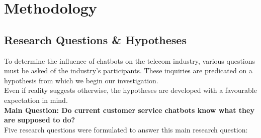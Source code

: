 \mainmatter
\pagestyle{headings}

\chapter{Methodology}
\label{ch:methodology}
\section{Research Questions \& Hypotheses}
To determine the influence of chatbots on the telecom industry, various questions must be asked of the industry's participants. These inquiries are predicated on a hypothesis from which we begin our investigation.\\
\break
Even if reality suggests otherwise, the hypotheses are developed with a favourable expectation in mind.\\
\break
\textbf{Main Question: Do current customer service chatbots know what they are supposed to do?}\\
\break 
Five research questions were formulated to answer this main research question:

